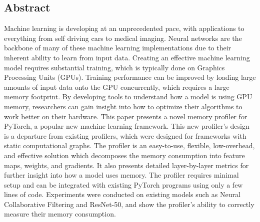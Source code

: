 \documentclass[12pt,letterpaper]{article}
\begin{document}
\thispagestyle{empty}

\clearpage
\begin{singlespace}
\begin{center}
\section*{Abstract}
\end{center}
Machine learning is developing at an unprecedented pace, with applications to everything from self driving cars to medical imaging. Neural networks are the backbone of many of these machine learning implementations due to their inherent ability to learn from input data. Creating an effective machine learning model requires substantial training, which is typically done on Graphics Processing Units (GPUs). Training performance can be improved by loading large amounts of input data onto the GPU concurrently, which requires a large memory footprint. By developing tools to understand how a model is using GPU memory, researchers can gain insight into how to optimize their algorithms to work better on their hardware. This paper presents a novel memory profiler for PyTorch, a popular new machine learning framework. This new profiler's design is a departure from existing profilers, which were designed for frameworks with static computational graphs. The  profiler is an easy-to-use, flexible, low-overhead, and effective solution which decomposes the memory consumption into feature maps, weights, and gradients. It also presents detailed layer-by-layer metrics for further insight into how a model uses memory. The profiler requires minimal setup and can be integrated with existing PyTorch programs using only a few lines of code. Experiments were conducted on existing models such as Neural Collaborative Filtering and ResNet-50, and show the profiler's ability to correctly measure their memory consumption.
\end{singlespace}
\newpage 
\tableofcontents
\newpage

\listoffigures
\newpage 




\end{document}
